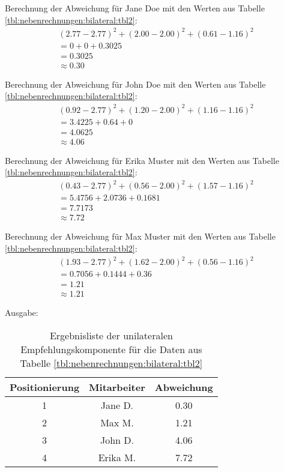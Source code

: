 Berechnung der Abweichung für Jane Doe mit den Werten aus Tabelle \ref{tbl:nebenrechnungen:bilateral:tbl2}:
\begin{gather}
	\nonumber (2.77-2.77)^2 + (2.00-2.00)^2 + (0.61-1.16)^2\\
	\nonumber = 0 + 0 + 0.3025\\
	\nonumber = 0.3025\\
	\approx 0.30
	\label{frml:nebenrechnungen:bilateral:jane}
\end{gather}

Berechnung der Abweichung für John Doe mit den Werten aus Tabelle \ref{tbl:nebenrechnungen:bilateral:tbl2}:
\begin{gather}
	\nonumber (0.92-2.77)^2 + (1.20-2.00)^2 + (1.16-1.16)^2\\
	\nonumber = 3.4225 + 0.64 + 0\\
	\nonumber = 4.0625\\
	\approx 4.06
	\label{frml:nebenrechnungen:bilateral:john}
\end{gather}

Berechnung der Abweichung für Erika Muster mit den Werten aus Tabelle \ref{tbl:nebenrechnungen:bilateral:tbl2}:
\begin{gather}
	\nonumber (0.43-2.77)^2 + (0.56-2.00)^2 + (1.57-1.16)^2\\
	\nonumber = 5.4756 + 2.0736 + 0.1681\\
	\nonumber = 7.7173\\
	\approx 7.72
	\label{frml:nebenrechnungen:bilateral:erika}
\end{gather}

Berechnung der Abweichung für Max Muster mit den Werten aus Tabelle \ref{tbl:nebenrechnungen:bilateral:tbl2}:
\begin{gather}
	\nonumber (1.93-2.77)^2 + (1.62-2.00)^2 + (0.56-1.16)^2\\
	\nonumber = 0.7056 + 0.1444 + 0.36\\
	\nonumber = 1.21\\
	\approx 1.21
	\label{frml:nebenrechnungen:bilateral:max}
\end{gather}

Ausgabe:
\begin{table}[h]
	\centering
	\begin{tabular}{c|c|c}
		Positionierung & Mitarbeiter & Abweichung\\
		\hline
		1 & Jane D.  & 0.30\\
		2 & Max M.   & 1.21\\
		3 & John D.  & 4.06\\
		4 & Erika M. & 7.72
	\end{tabular}
	\caption{Ergebnisliste der unilateralen Empfehlungskomponente für die Daten aus Tabelle \ref{tbl:nebenrechnungen:bilateral:tbl2}}
	\label{tbl:nebenrechnungen:unilateral:ausgabe}
\end{table}